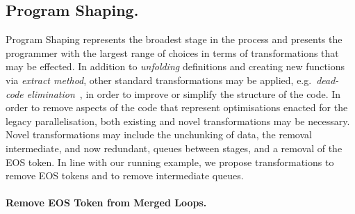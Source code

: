 





\subsection{Program Shaping.}
\label{sec:refac:shaping}

Program Shaping represents the broadest stage in the process and presents the programmer with the largest range of choices in terms of transformations that may be effected. In addition to \emph{unfolding} definitions and creating new functions via \emph{extract method}, other standard transformations may be applied, e.g.\ \emph{dead-code elimination}~\cite{Kennedy:DeadCodeElimination}, in order to improve or simplify the structure of the code. In order to remove aspects of the code that represent optimisations enacted for the legacy parallelisation, both existing and novel transformations may be necessary. Novel transformations may include the unchunking of data, the removal intermediate, and now redundant, queues between stages, and a removal of the EOS token. In line with our running example, we propose transformations to remove EOS tokens and to remove intermediate queues.


\paragraph{Remove EOS Token from Merged Loops.}

